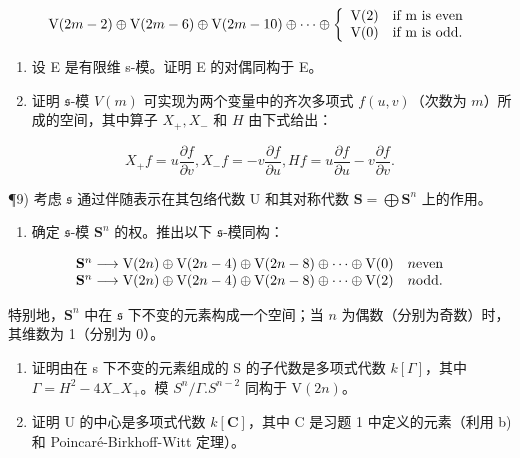 \[
\mathrm{V} (2 m - 2) \oplus \mathrm{V} (2 m - 6) \oplus \mathrm{V} (2 m - 10) \oplus \dots \oplus \left\{ \begin{array}{l l} \mathrm{V} (2) & \text {if m is even} \\ \mathrm{V} (0) & \text {if m is odd.} \end{array} \right.
\]

\begin{enumerate}
\def\labelenumi{\arabic{enumi})}
\setcounter{enumi}{6}
\item
  设 E 是有限维 s-模。证明 E 的对偶同构于 E。
\item
  证明 \(\mathfrak{s}\)-模 \(V(m)\) 可实现为两个变量中的齐次多项式 \(f(u,v)\)（次数为 \(m\)）所成的空间，其中算子 \(X_{+}, X_{-}\) 和 \(H\) 由下式给出：
\end{enumerate}

\[
X _ {+} f = u \frac {\partial f}{\partial v}, X _ {-} f = - v \frac {\partial f}{\partial u}, H f = u \frac {\partial f}{\partial u} - v \frac {\partial f}{\partial v}.
\]

¶9) 考虑 \(\mathfrak{s}\) 通过伴随表示在其包络代数 U 和其对称代数 \(\mathbf{S} = \bigoplus \mathbf{S}^n\) 上的作用。

\begin{enumerate}
\def\labelenumi{\alph{enumi})}
\tightlist
\item
  确定 \(\mathfrak{s}\)-模 \(\mathbf{S}^n\) 的权。推出以下 \(\mathfrak{s}\)-模同构：
\end{enumerate}

\[
\begin{array}{l l} \mathbf {S} ^ {n} \longrightarrow \mathrm{V} (2 n) \oplus \mathrm{V} (2 n - 4) \oplus \mathrm{V} (2 n - 8) \oplus \dots \oplus \mathrm{V} (0) & n \text {even} \\ \mathbf {S} ^ {n} \longrightarrow \mathrm{V} (2 n) \oplus \mathrm{V} (2 n - 4) \oplus \mathrm{V} (2 n - 8) \oplus \dots \oplus \mathrm{V} (2) & n \text {odd}. \end{array}
\]

特别地，\(\mathbf{S}^n\) 中在 \(\mathfrak{s}\) 下不变的元素构成一个空间；当 \(n\) 为偶数（分别为奇数）时，其维数为 1（分别为 0）。

\begin{enumerate}
\def\labelenumi{\alph{enumi})}
\setcounter{enumi}{1}
\item
  证明由在 s 下不变的元素组成的 S 的子代数是多项式代数 \(k[\Gamma]\)，其中 \(\Gamma = H^{2} - 4X_{-}X_{+}\)。模 \(S^{n}/\Gamma.S^{n-2}\) 同构于 \(\mathrm{V}(2n)\)。
\item
  证明 U 的中心是多项式代数 \(k[\mathbf{C}]\)，其中 C 是习题 1 中定义的元素（利用 b) 和 Poincaré-Birkhoff-Witt 定理）。
\end{enumerate}

